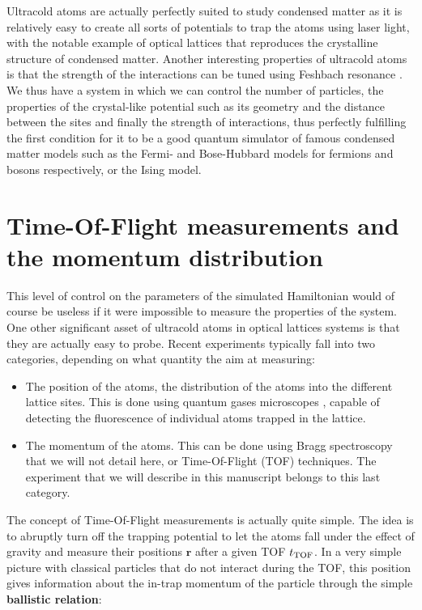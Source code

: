 Ultracold atoms are actually perfectly suited to study condensed matter as it is relatively easy to create all sorts of potentials to trap the atoms using laser light, with the notable example of optical lattices \cite{bloch2005ultracold} that reproduces the crystalline structure of condensed matter. Another interesting properties of ultracold atoms is that the strength of the interactions can be tuned using Feshbach resonance \cite{chin2010feshbach,feshbach1958unified}. We thus have a system in which we can control the number of particles, the properties of the crystal-like potential such as its geometry and the distance between the sites and finally the strength of interactions, thus perfectly fulfilling the first condition for it to be a good quantum simulator of famous condensed matter models such as the Fermi- and Bose-Hubbard models for fermions and bosons respectively, or the Ising model. 

\section*{Time-Of-Flight measurements and the momentum distribution}

This level of control on the parameters of the simulated Hamiltonian would of course be useless if it were impossible to measure the properties of the system. One other significant asset of ultracold atoms in optical lattices systems is that they are actually easy to probe. Recent experiments typically fall into two categories, depending on what quantity the aim at measuring:

\begin{itemize}
 \item The position of the atoms, \ie the distribution of the atoms into the different lattice sites. This is done using quantum gases microscopes \cite{bakr2009quantum}, capable of detecting the fluorescence of individual atoms trapped in the lattice.
 \item The momentum of the atoms. This can be done using Bragg spectroscopy \cite{stenger1999} that we will not detail here, or Time-Of-Flight (TOF) techniques. The experiment that we will describe in this manuscript belongs to this last category.
\end{itemize}

The concept of Time-Of-Flight measurements is actually quite simple. The idea is to abruptly turn off the trapping potential to let the atoms fall under the effect of gravity and measure their positions $\bm{r}$ after a given TOF $t_{\rm{TOF}}$. In a very simple picture with classical particles that do not interact during the TOF, this position gives information about the in-trap momentum of the particle through the simple \textbf{ballistic relation}:

